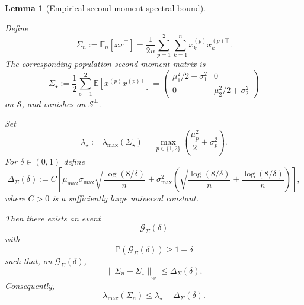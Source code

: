 \documentclass{article} %
\theoremstyle{plain}
\newtheorem{lemma}[theorem]{Lemma}
\theoremstyle{definition}
\theoremstyle{remark}
\begin{document}

\begin{lemma}[Empirical second-moment spectral bound]
\label{lem:second-moment}

Define
\[
\Sigma_n
:=
\mathbb E_n[xx^\top]
=
\frac1{2n}
\sum_{p=1}^2
\sum_{k=1}^n
x_k^{(p)}x_k^{(p)\top}.
\]
The corresponding population second-moment matrix is
\[
\Sigma_\star
:=
\frac12
\sum_{p=1}^2
\mathbb E
\left[
x^{(p)}x^{(p)\top}
\right]
=
\begin{pmatrix}
\mu_1^2/2+\sigma_1^2 & 0\\
0 & \mu_2^2/2+\sigma_2^2
\end{pmatrix}
\]
on $\mathcal S$, and vanishes on $\mathcal S^\perp$.

Set
\[
\lambda_\star
:=
\lambda_{\max}(\Sigma_\star)
=
\max_{p\in\{1,2\}}
\left(
\frac{\mu_p^2}{2}+\sigma_p^2
\right).
\]
For $\delta\in(0,1)$ define
\[
\Delta_\Sigma(\delta)
:=
C
\left[
\mu_{\max}\sigma_{\max}
\sqrt{\frac{\log(8/\delta)}{n}}
+
\sigma_{\max}^2
\left(
\sqrt{\frac{\log(8/\delta)}{n}}
+
\frac{\log(8/\delta)}{n}
\right)
\right],
\]
where $C>0$ is a sufficiently large universal constant.

Then there exists an event
\[
\mathcal G_\Sigma(\delta)
\]
with
\[
\mathbb P(\mathcal G_\Sigma(\delta))
\ge
1-\delta
\]
such that, on $\mathcal G_\Sigma(\delta)$,
\[
\boxed{
\|\Sigma_n-\Sigma_\star\|_{_{\mathrm{op}}}
\le
\Delta_\Sigma(\delta).
}
\]
Consequently,
\[
\boxed{
\lambda_{\max}(\Sigma_n)
\le
\lambda_\star+\Delta_\Sigma(\delta).
}
\]
\end{lemma}
\end{document}
